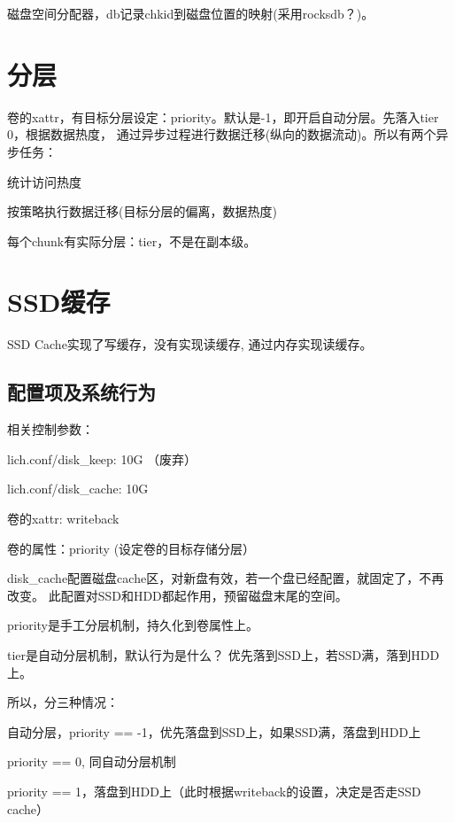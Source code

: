 磁盘空间分配器，db记录chkid到磁盘位置的映射(采用rocksdb？)。

\section{分层}

卷的xattr，有目标分层设定：priority。默认是-1，即开启自动分层。先落入tier 0，根据数据热度，
通过异步过程进行数据迁移(纵向的数据流动)。所以有两个异步任务：
\begin{compactenum}
\item 统计访问热度
\item 按策略执行数据迁移(目标分层的偏离，数据热度)
\end{compactenum}

每个chunk有实际分层：tier，不是在副本级。

\section{SSD缓存}

SSD Cache实现了写缓存，没有实现读缓存, 通过内存实现读缓存。

\subsection{配置项及系统行为}

相关控制参数：
\begin{enumbox}
\item lich.conf/disk\_keep: 10G （废弃）
\item lich.conf/disk\_cache: 10G
\item 卷的xattr: writeback
\item 卷的属性：priority (设定卷的目标存储分层）
\end{enumbox}

disk\_cache配置磁盘cache区，对新盘有效，若一个盘已经配置，就固定了，不再改变。
此配置对SSD和HDD都起作用，预留磁盘末尾的空间。

priority是手工分层机制，持久化到卷属性上。

tier是自动分层机制，默认行为是什么？ 优先落到SSD上，若SSD满，落到HDD上。

所以，分三种情况：
\begin{compactenum}
\item 自动分层，priority == -1，优先落盘到SSD上，如果SSD满，落盘到HDD上
\item priority == 0, 同自动分层机制
\item priority == 1，落盘到HDD上（此时根据writeback的设置，决定是否走SSD cache）
\end{compactenum}

